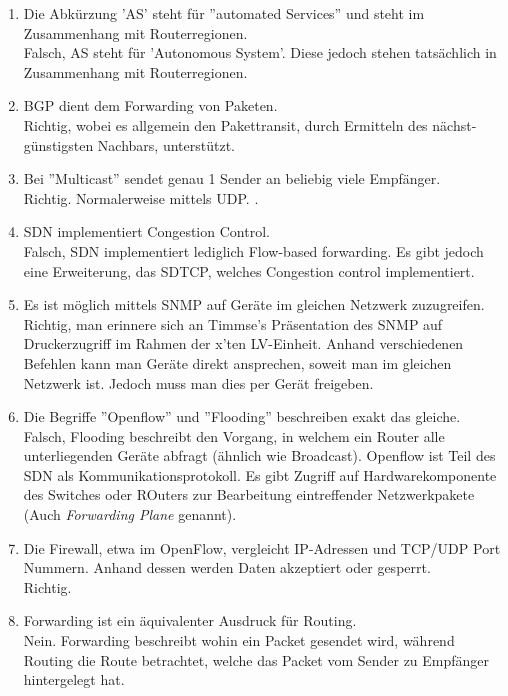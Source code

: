 \documentclass{scrartcl}
\begin{document}
\begin{enumerate}
        \item Die Abkürzung 'AS' steht für ''automated Services'' und steht im Zusammenhang mit Routerregionen.\\
        Falsch, AS steht für 'Autonomous System'. Diese jedoch stehen tatsächlich in Zusammenhang mit Routerregionen.
        
        \item BGP dient dem Forwarding von Paketen.\\
        Richtig, wobei es allgemein den Pakettransit, durch Ermitteln des nächst-günstigsten Nachbars, unterstützt.
        
        \item Bei ''Multicast'' sendet genau 1 Sender an beliebig viele Empfänger.\\
        Richtig. Normalerweise mittels UDP.
        .
        \item SDN implementiert Congestion Control.\\
        Falsch, SDN implementiert lediglich Flow-based forwarding. Es gibt jedoch eine Erweiterung, das SDTCP, welches Congestion control implementiert. 
        
        \item Es ist möglich mittels SNMP auf Geräte im gleichen Netzwerk zuzugreifen.\\
        Richtig, man erinnere sich an Timmse's Präsentation des SNMP auf Druckerzugriff im Rahmen der x'ten LV-Einheit. Anhand verschiedenen Befehlen kann man Geräte direkt ansprechen, soweit man im gleichen Netzwerk ist. Jedoch muss man dies per Gerät freigeben.
        
        \item Die Begriffe ''Openflow'' und ''Flooding'' beschreiben exakt das gleiche.\\
        Falsch, Flooding beschreibt den Vorgang, in welchem ein Router alle unterliegenden Geräte abfragt (ähnlich wie Broadcast). Openflow ist Teil des SDN als Kommunikationsprotokoll. Es gibt Zugriff auf Hardwarekomponente des Switches oder ROuters zur Bearbeitung eintreffender Netzwerkpakete (Auch \textit{Forwarding Plane} genannt).
        
        \item Die Firewall, etwa im OpenFlow, vergleicht IP-Adressen und TCP/UDP Port Nummern. Anhand dessen werden Daten akzeptiert oder gesperrt.\\
        Richtig.
        
        \item Forwarding ist ein äquivalenter Ausdruck für Routing.\\
        Nein. Forwarding beschreibt wohin ein Packet gesendet wird, während Routing die Route betrachtet, welche das Packet vom Sender zu Empfänger hintergelegt hat.
        

\end{enumerate}
\end{document}
